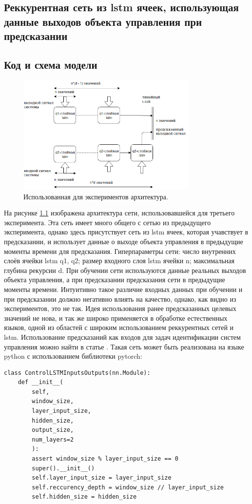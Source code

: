 \documentclass[12pt, oneside]{extbook}
\begin{document}
\begin{flushleft}
\chapter{Реккурентная сеть из lstm ячеек, использующая данные выходов объекта управления при предсказании}
\section{Код и схема модели}
\par
\begin{figure}[h]
\centering
\includegraphics[width=0.8\textwidth]{updated_rnn}
\caption{Использованная для экспериментов архитектура.}
\label{fig:lstm_net_inputs}
\end{figure}
На рисунке \ref{fig:lstm_net_inputs} изображена архитектура сети, использовавшейся для третьего эксперимента. Эта сеть имеет много общего с сетью из предыдущего эксперимента, однако здесь присутствует сеть из lstm ячеек, которая учавствует в предсказании, и использует данные о выходе объекта управления в предыдущие моменты времени для предсказания. Гиперпараметры сети: число внутренних слоёв ячейки lstm q1, q2; размер входного слоя lstm ячейки n; максимальная глубина рекурсии d. При обучении сети используются данные реальных выходов объекта управления, а при предсказании предсказания сети в предыдущие моменты времени. Интуитивно такое различие входных данных при обучении и при предсказании должно негативно влиять на качество, однако, как видно из экспериментов, это не так. Идея использования ранее предсказанных целевых значений не нова, и так же широко применяется в обработке естественных языков, одной из областей с широким использованием реккурентных сетей и lstm. Использование предсказаний как входов для задач идентификации систем управления можно найти в статье \cite{lstm_2017}. Такая сеть может быть реализована на языке python  с использованием библиотеки pytorch:
\begin{verbatim}
class ControlLSTMInputsOutputs(nn.Module):
    def __init__(
        self,
        window_size,
        layer_input_size,
        hidden_size,
        output_size,
        num_layers=2
        ):
        assert window_size % layer_input_size == 0
        super().__init__()
        self.layer_input_size = layer_input_size
        self.reccurency_depth = window_size // layer_input_size
        self.hidden_size = hidden_size


\end{verbatim}
\end{flushleft}
\end{document}
